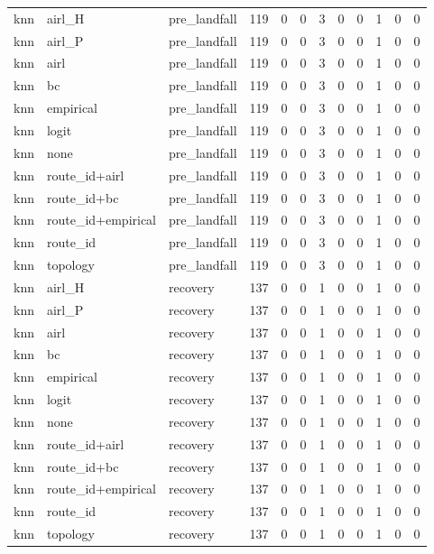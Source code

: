 \begin{tabular}{lllrrrrrrrrr}
knn & airl_H & pre_landfall & 119 & 0 & 0 & 3 & 0 & 0 & 1 & 0 & 0 \\
knn & airl_P & pre_landfall & 119 & 0 & 0 & 3 & 0 & 0 & 1 & 0 & 0 \\
knn & airl & pre_landfall & 119 & 0 & 0 & 3 & 0 & 0 & 1 & 0 & 0 \\
knn & bc & pre_landfall & 119 & 0 & 0 & 3 & 0 & 0 & 1 & 0 & 0 \\
knn & empirical & pre_landfall & 119 & 0 & 0 & 3 & 0 & 0 & 1 & 0 & 0 \\
knn & logit & pre_landfall & 119 & 0 & 0 & 3 & 0 & 0 & 1 & 0 & 0 \\
knn & none & pre_landfall & 119 & 0 & 0 & 3 & 0 & 0 & 1 & 0 & 0 \\
knn & route_id+airl & pre_landfall & 119 & 0 & 0 & 3 & 0 & 0 & 1 & 0 & 0 \\
knn & route_id+bc & pre_landfall & 119 & 0 & 0 & 3 & 0 & 0 & 1 & 0 & 0 \\
knn & route_id+empirical & pre_landfall & 119 & 0 & 0 & 3 & 0 & 0 & 1 & 0 & 0 \\
knn & route_id & pre_landfall & 119 & 0 & 0 & 3 & 0 & 0 & 1 & 0 & 0 \\
knn & topology & pre_landfall & 119 & 0 & 0 & 3 & 0 & 0 & 1 & 0 & 0 \\
knn & airl_H & recovery & 137 & 0 & 0 & 1 & 0 & 0 & 1 & 0 & 0 \\
knn & airl_P & recovery & 137 & 0 & 0 & 1 & 0 & 0 & 1 & 0 & 0 \\
knn & airl & recovery & 137 & 0 & 0 & 1 & 0 & 0 & 1 & 0 & 0 \\
knn & bc & recovery & 137 & 0 & 0 & 1 & 0 & 0 & 1 & 0 & 0 \\
knn & empirical & recovery & 137 & 0 & 0 & 1 & 0 & 0 & 1 & 0 & 0 \\
knn & logit & recovery & 137 & 0 & 0 & 1 & 0 & 0 & 1 & 0 & 0 \\
knn & none & recovery & 137 & 0 & 0 & 1 & 0 & 0 & 1 & 0 & 0 \\
knn & route_id+airl & recovery & 137 & 0 & 0 & 1 & 0 & 0 & 1 & 0 & 0 \\
knn & route_id+bc & recovery & 137 & 0 & 0 & 1 & 0 & 0 & 1 & 0 & 0 \\
knn & route_id+empirical & recovery & 137 & 0 & 0 & 1 & 0 & 0 & 1 & 0 & 0 \\
knn & route_id & recovery & 137 & 0 & 0 & 1 & 0 & 0 & 1 & 0 & 0 \\
knn & topology & recovery & 137 & 0 & 0 & 1 & 0 & 0 & 1 & 0 & 0 \\

\end{tabular}
